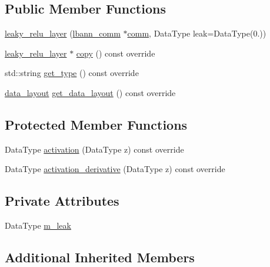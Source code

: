 \subsection*{Public Member Functions}
\begin{DoxyCompactItemize}
\item 
\hyperlink{classlbann_1_1leaky__relu__layer_ae401114a3517c40aabde7fbb9d990a1c}{leaky\+\_\+relu\+\_\+layer} (\hyperlink{classlbann_1_1lbann__comm}{lbann\+\_\+comm} $\ast$\hyperlink{file__io_8cpp_ab048c6f9fcbcfaa57ce68b00263dbebe}{comm}, Data\+Type leak=Data\+Type(0.))
\item 
\hyperlink{classlbann_1_1leaky__relu__layer}{leaky\+\_\+relu\+\_\+layer} $\ast$ \hyperlink{classlbann_1_1leaky__relu__layer_a5567cfef802bfed6be3e092970b88ff9}{copy} () const override
\item 
std\+::string \hyperlink{classlbann_1_1leaky__relu__layer_a76f9d4a88ffedc6bf38f6cccb88e9894}{get\+\_\+type} () const override
\item 
\hyperlink{base_8hpp_a786677cbfb3f5677b4d84f3056eb08db}{data\+\_\+layout} \hyperlink{classlbann_1_1leaky__relu__layer_a9e7ce0b05e8bff42d9176d92c736fbcb}{get\+\_\+data\+\_\+layout} () const override
\end{DoxyCompactItemize}
\subsection*{Protected Member Functions}
\begin{DoxyCompactItemize}
\item 
Data\+Type \hyperlink{classlbann_1_1leaky__relu__layer_a173d09aa2c6d699634b2ef64a5952ba9}{activation} (Data\+Type z) const override
\item 
Data\+Type \hyperlink{classlbann_1_1leaky__relu__layer_af37ff5bcaefa8e533b3c497611ff43d4}{activation\+\_\+derivative} (Data\+Type z) const override
\end{DoxyCompactItemize}
\subsection*{Private Attributes}
\begin{DoxyCompactItemize}
\item 
Data\+Type \hyperlink{classlbann_1_1leaky__relu__layer_afafa6711960f1114b6247fcb5a30c36f}{m\+\_\+leak}
\end{DoxyCompactItemize}
\subsection*{Additional Inherited Members}


